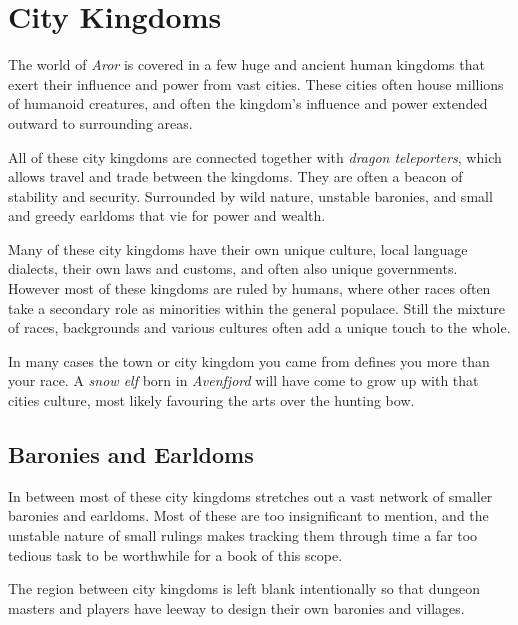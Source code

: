 \section*{City Kingdoms}

The world of \emph{Aror} is covered in a few huge and ancient human kingdoms
that exert their influence and power from vast cities. These cities often house
millions of humanoid creatures, and often the kingdom's influence and power
extended outward to surrounding areas.

All of these city kingdoms are connected together with \emph{dragon
  teleporters}, which allows travel and trade between the kingdoms. They are
often a beacon of stability and security. Surrounded by wild nature, unstable
baronies, and small and greedy earldoms that vie for power and wealth.

Many of these city kingdoms have their own unique culture, local language
dialects, their own laws and customs, and often also unique governments. However
most of these kingdoms are ruled by humans, where other races often take a
secondary role as minorities within the general populace. Still the mixture
of races, backgrounds and various cultures often add a unique touch to the
whole.

In many cases the town or city kingdom you came from defines you more than
your race. A \emph{snow elf} born in \emph{Avenfjord} will have come to grow
up with that cities culture, most likely favouring the arts over the hunting
bow.

\subsection*{Baronies and Earldoms}

In between most of these city kingdoms stretches out a vast network of smaller
baronies and earldoms. Most of these are too insignificant to mention, and the
unstable nature of small rulings makes tracking them through time a far too
tedious task to be worthwhile for a book of this scope.


\begin{note}
  The region between city kingdoms is left blank intentionally so that dungeon
  masters and players have leeway to design their own baronies and villages.
\end{note}



